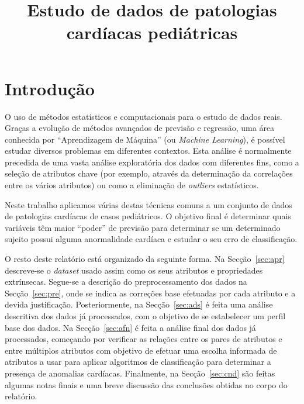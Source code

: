 \documentclass[10pt, conference, compsocconf]{IEEEtran}
\begin{document}
\title{Estudo de dados de patologias cardíacas pediátricas}

\author{
  \and
}

\newcommand{\PreImg}[1]{
  \begin{figure}[H]
    \centering
    \texttt{[image: img/pre\_\#1.png]}
    \caption{Distribuição de {\tt #1} em relação a {\tt nxa}}
    \label{fig:pre#1}
  \end{figure}
}

\maketitle


\section{Introdução}
\label{sec:int}

O uso de métodos estatísticos e computacionais para o estudo de dados
reais. Graças a evolução de métodos avançados de previsão e regressão,
uma área conhecida por ``Aprendizagem de Máquina'' (ou \textit{Machine
  Learning}), é possível estudar diversos problemas em diferentes
contextos. Esta análise é normalmente precedida de uma vasta análise
exploratória dos dados com diferentes fins, como a seleção de
atributos chave (por exemplo, através da determinação da correlações
entre os vários atributos) ou como a eliminação de \textit{outliers}
estatísticos.

Neste trabalho aplicamos várias destas técnicas comuns a um conjunto
de dados de patologias cardíacas de casos pediátricos. O objetivo
final é determinar quais variáveis têm maior ``poder'' de previsão
para determinar se um determinado sujeito possui alguma anormalidade
cardíaca e estudar o seu erro de classificação.

O resto deste relatório está organizado da seguinte forma. Na
Secção~\ref{sec:apr} descreve-se o \textit{dataset} usado assim como
os seus atributos e propriedades extrínsecas. Segue-se a descrição do
preprocessamento dos dados na Secção~\ref{sec:pre}, onde se indica as
correções base efetuadas por cada atributo e a devida
justificação. Posteriormente, na Secção~\ref{sec:ads} é feita uma
análise descritiva dos dados já processados, com o objetivo de se
estabelecer um perfil base dos dados. Na Secção~\ref{sec:afn} é feita
a análise final dos dados já processados, começando por verificar as
relações entre os pares de atributos e entre múltiplos atributos com
objetivo de efetuar uma escolha informada de atributos a usar para
aplicar algoritmos de classificação para determinar a presença de
anomalias cardíacas. Finalmente, na Secção~\ref{sec:cnd} são feitas
algumas notas finais e uma breve discussão das conclusões obtidas no
corpo do relatório.
\end{document}
